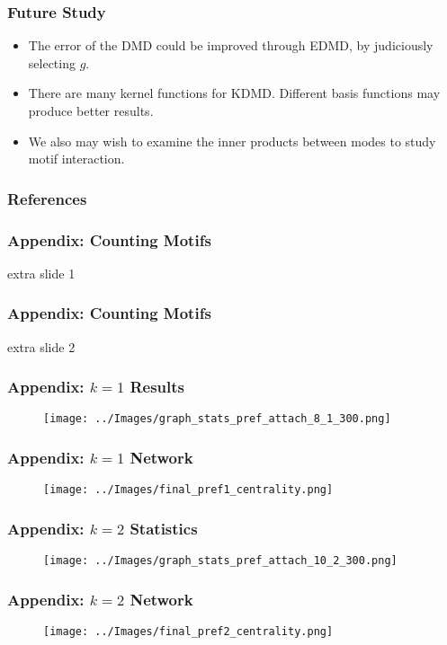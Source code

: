 \documentclass{beamer}
\begin{document}
\begin{frame}
\frametitle{Future Study}
\begin{itemize}
    \item The error of the DMD could be improved through EDMD, by judiciously selecting $g$. 
    \item There are many kernel functions for KDMD. Different basis functions may produce better results. 
    \item We also may wish to examine the inner products between modes to study motif interaction.
\end{itemize}
\end{frame}

\begin{frame}[allowframebreaks]
    \frametitle{References}
    
    
\end{frame}


\appendix %

\begin{frame}
    \frametitle{Appendix: Counting Motifs}
extra slide 1
\end{frame}

\begin{frame}
    \frametitle{Appendix: Counting Motifs}
extra slide 2
\end{frame}

\begin{frame}
    \frametitle{Appendix: $k=1$ Results}
    \begin{figure}
        \texttt{[image: ../Images/graph\_stats\_pref\_attach\_8\_1\_300.png]}
    \centering
    \end{figure}
\end{frame}

\begin{frame}
    \frametitle{Appendix: $k=1$ Network}
    \begin{figure}
        \texttt{[image: ../Images/final\_pref1\_centrality.png]}
    \centering
    \end{figure}
\end{frame}

\begin{frame}
    \frametitle{Appendix: $k=2$ Statistics}
    \begin{figure}
        \texttt{[image: ../Images/graph\_stats\_pref\_attach\_10\_2\_300.png]}
    \centering
    \end{figure}
\end{frame}

\begin{frame}
    \frametitle{Appendix: $k=2$ Network}
    \begin{figure}
        \texttt{[image: ../Images/final\_pref2\_centrality.png]}
    \centering
    \end{figure}
\end{frame}
\end{document}
